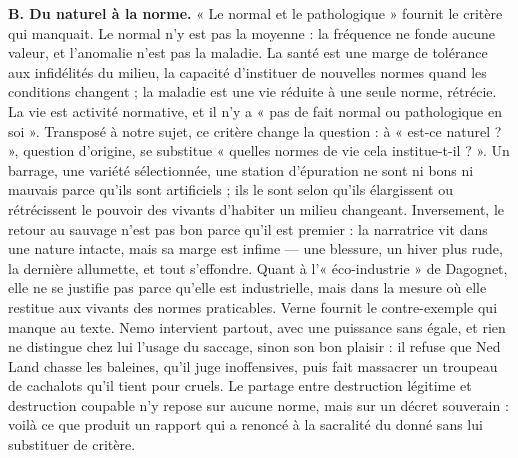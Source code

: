 \documentclass[11pt,a4paper]{article}
\begin{document}
\textbf{B. Du naturel à la norme.} « Le normal et le pathologique » fournit le critère qui manquait. Le normal n'y est pas la moyenne : la fréquence ne fonde aucune valeur, et l'anomalie n'est pas la maladie. La santé est une marge de tolérance aux infidélités du milieu, la capacité d'instituer de nouvelles normes quand les conditions changent ; la maladie est une vie réduite à une seule norme, rétrécie. La vie est activité normative, et il n'y a « pas de fait normal ou pathologique en soi ». Transposé à notre sujet, ce critère change la question : à « est-ce naturel ? », question d'origine, se substitue « quelles normes de vie cela institue-t-il ? ». Un barrage, une variété sélectionnée, une station d'épuration ne sont ni bons ni mauvais parce qu'ils sont artificiels ; ils le sont selon qu'ils élargissent ou rétrécissent le pouvoir des vivants d'habiter un milieu changeant. Inversement, le retour au sauvage n'est pas bon parce qu'il est premier : la narratrice vit dans une nature intacte, mais sa marge est infime --- une blessure, un hiver plus rude, la dernière allumette, et tout s'effondre. Quant à l'« éco-industrie » de Dagognet, elle ne se justifie pas parce qu'elle est industrielle, mais dans la mesure où elle restitue aux vivants des normes praticables. Verne fournit le contre-exemple qui manque au texte. Nemo intervient partout, avec une puissance sans égale, et rien ne distingue chez lui l'usage du saccage, sinon son bon plaisir : il refuse que Ned Land chasse les baleines, qu'il juge inoffensives, puis fait massacrer un troupeau de cachalots qu'il tient pour cruels. Le partage entre destruction légitime et destruction coupable n'y repose sur aucune norme, mais sur un décret souverain : voilà ce que produit un rapport qui a renoncé à la sacralité du donné sans lui substituer de critère.
\end{document}
